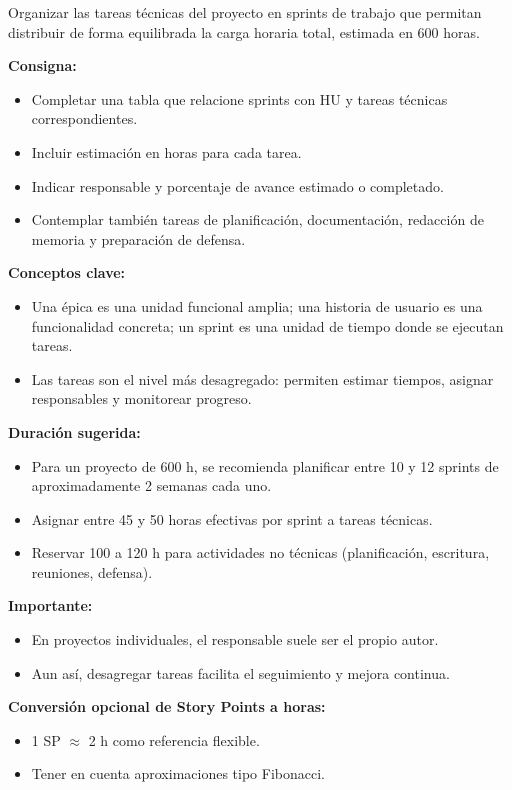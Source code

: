 \documentclass[
11pt, %
]{ProyectoVpC}
\begin{document}
Organizar las tareas técnicas del proyecto en sprints de trabajo que permitan distribuir de forma equilibrada la carga horaria total, estimada en 600 horas.

\textbf{Consigna:}
\begin{itemize}
  \item Completar una tabla que relacione sprints con HU y tareas técnicas correspondientes.
  \item Incluir estimación en horas para cada tarea.
  \item Indicar responsable y porcentaje de avance estimado o completado.
  \item Contemplar también tareas de planificación, documentación, redacción de memoria y preparación de defensa.
\end{itemize}

\textbf{Conceptos clave:}
\begin{itemize}
  \item Una \'{e}pica es una unidad funcional amplia; una historia de usuario es una funcionalidad concreta; un sprint es una unidad de tiempo donde se ejecutan tareas.
  \item Las tareas son el nivel más desagregado: permiten estimar tiempos, asignar responsables y monitorear progreso.
\end{itemize}

\textbf{Duración sugerida:}
\begin{itemize}
  \item Para un proyecto de 600 h, se recomienda planificar entre 10 y 12 sprints de aproximadamente 2 semanas cada uno.
  \item Asignar entre 45 y 50 horas efectivas por sprint a tareas técnicas.
  \item Reservar 100 a 120 h para actividades no técnicas (planificación, escritura, reuniones, defensa).
\end{itemize}

\textbf{Importante:}
\begin{itemize}
  \item En proyectos individuales, el responsable suele ser el propio autor.
  \item Aun así, desagregar tareas facilita el seguimiento y mejora continua.
\end{itemize}

\textbf{Conversión opcional de Story Points a horas:}
\begin{itemize}
  \item 1 SP \(\approx\) 2 h como referencia flexible.
  \item Tener en cuenta aproximaciones tipo Fibonacci.
\end{itemize}
\end{document}
